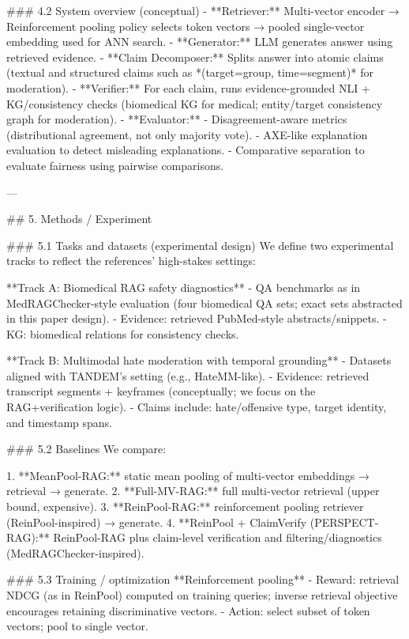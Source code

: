 ### 4.2 System overview (conceptual)  
- **Retriever:** Multi-vector encoder → Reinforcement pooling policy selects token vectors → pooled single-vector embedding used for ANN search.  
- **Generator:** LLM generates answer using retrieved evidence.  
- **Claim Decomposer:** Splits answer into atomic claims (textual and structured claims such as *(target=group, time=segment)* for moderation).  
- **Verifier:** For each claim, runs evidence-grounded NLI + KG/consistency checks (biomedical KG for medical; entity/target consistency graph for moderation).  
- **Evaluator:**  
  - Disagreement-aware metrics (distributional agreement, not only majority vote).  
  - AXE-like explanation evaluation to detect misleading explanations.  
  - Comparative separation to evaluate fairness using pairwise comparisons.

---

## 5. Methods / Experiment  

### 5.1 Tasks and datasets (experimental design)  
We define two experimental tracks to reflect the references’ high-stakes settings:

**Track A: Biomedical RAG safety diagnostics**  
- QA benchmarks as in MedRAGChecker-style evaluation (four biomedical QA sets; exact sets abstracted in this paper design).  
- Evidence: retrieved PubMed-style abstracts/snippets.  
- KG: biomedical relations for consistency checks.

**Track B: Multimodal hate moderation with temporal grounding**  
- Datasets aligned with TANDEM’s setting (e.g., HateMM-like).  
- Evidence: retrieved transcript segments + keyframes (conceptually; we focus on the RAG+verification logic).  
- Claims include: hate/offensive type, target identity, and timestamp spans.

### 5.2 Baselines  
We compare:

1. **MeanPool-RAG:** static mean pooling of multi-vector embeddings → retrieval → generate.  
2. **Full-MV-RAG:** full multi-vector retrieval (upper bound, expensive).  
3. **ReinPool-RAG:** reinforcement pooling retriever (ReinPool-inspired) → generate.  
4. **ReinPool + ClaimVerify (PERSPECT-RAG):** ReinPool-RAG plus claim-level verification and filtering/diagnostics (MedRAGChecker-inspired).  

### 5.3 Training / optimization  
**Reinforcement pooling**  
- Reward: retrieval NDCG (as in ReinPool) computed on training queries; inverse retrieval objective encourages retaining discriminative vectors.  
- Action: select subset of token vectors; pool to single vector.

